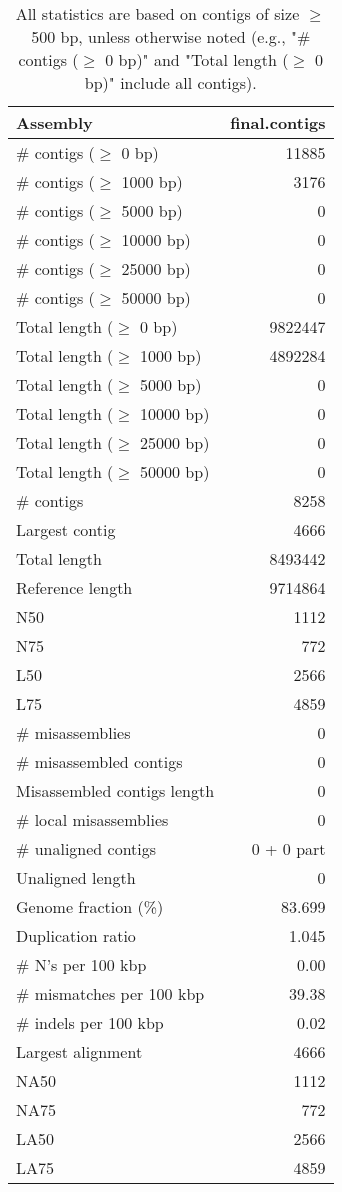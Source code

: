 \documentclass[12pt,a4paper]{article}
\begin{document}
\begin{table}[ht]
\begin{center}
\caption{All statistics are based on contigs of size $\geq$ 500 bp, unless otherwise noted (e.g., "\# contigs ($\geq$ 0 bp)" and "Total length ($\geq$ 0 bp)" include all contigs).}
\begin{tabular}{|l*{1}{|r}|}
\hline
Assembly & final.contigs \\ \hline
\# contigs ($\geq$ 0 bp) & 11885 \\ \hline
\# contigs ($\geq$ 1000 bp) & 3176 \\ \hline
\# contigs ($\geq$ 5000 bp) & 0 \\ \hline
\# contigs ($\geq$ 10000 bp) & 0 \\ \hline
\# contigs ($\geq$ 25000 bp) & 0 \\ \hline
\# contigs ($\geq$ 50000 bp) & 0 \\ \hline
Total length ($\geq$ 0 bp) & 9822447 \\ \hline
Total length ($\geq$ 1000 bp) & 4892284 \\ \hline
Total length ($\geq$ 5000 bp) & 0 \\ \hline
Total length ($\geq$ 10000 bp) & 0 \\ \hline
Total length ($\geq$ 25000 bp) & 0 \\ \hline
Total length ($\geq$ 50000 bp) & 0 \\ \hline
\# contigs & 8258 \\ \hline
Largest contig & 4666 \\ \hline
Total length & 8493442 \\ \hline
Reference length & 9714864 \\ \hline
N50 & 1112 \\ \hline
N75 & 772 \\ \hline
L50 & 2566 \\ \hline
L75 & 4859 \\ \hline
\# misassemblies & 0 \\ \hline
\# misassembled contigs & 0 \\ \hline
Misassembled contigs length & 0 \\ \hline
\# local misassemblies & 0 \\ \hline
\# unaligned contigs & 0 + 0 part \\ \hline
Unaligned length & 0 \\ \hline
Genome fraction (\%) & 83.699 \\ \hline
Duplication ratio & 1.045 \\ \hline
\# N's per 100 kbp & 0.00 \\ \hline
\# mismatches per 100 kbp & 39.38 \\ \hline
\# indels per 100 kbp & 0.02 \\ \hline
Largest alignment & 4666 \\ \hline
NA50 & 1112 \\ \hline
NA75 & 772 \\ \hline
LA50 & 2566 \\ \hline
LA75 & 4859 \\ \hline
\end{tabular}
\end{center}
\end{table}
\end{document}
